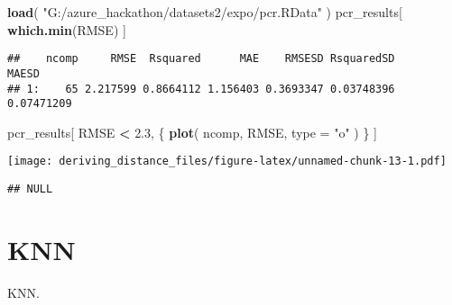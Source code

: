 \documentclass[]{article}
\newenvironment{Shaded}{\begin{snugshade}}{\end{snugshade}}
\newcommand{\DataTypeTok}[1]{\textcolor[rgb]{0.13,0.29,0.53}{#1}}
\newcommand{\DecValTok}[1]{\textcolor[rgb]{0.00,0.00,0.81}{#1}}
\newcommand{\FloatTok}[1]{\textcolor[rgb]{0.00,0.00,0.81}{#1}}
\newcommand{\KeywordTok}[1]{\textcolor[rgb]{0.13,0.29,0.53}{\textbf{#1}}}
\newcommand{\NormalTok}[1]{#1}
\newcommand{\OperatorTok}[1]{\textcolor[rgb]{0.81,0.36,0.00}{\textbf{#1}}}
\newcommand{\StringTok}[1]{\textcolor[rgb]{0.31,0.60,0.02}{#1}}
\begin{document}
\begin{Shaded}
\begin{Highlighting}[]
\KeywordTok{load}\NormalTok{( }\StringTok{"G:/azure_hackathon/datasets2/expo/pcr.RData"}\NormalTok{ )}
\NormalTok{pcr_results[ }\KeywordTok{which.min}\NormalTok{(RMSE) ]}
\end{Highlighting}
\end{Shaded}

\begin{verbatim}
##    ncomp     RMSE  Rsquared      MAE    RMSESD RsquaredSD      MAESD
## 1:    65 2.217599 0.8664112 1.156403 0.3693347 0.03748396 0.07471209
\end{verbatim}

\begin{Shaded}
\begin{Highlighting}[]
\NormalTok{pcr_results[ RMSE }\OperatorTok{<}\StringTok{ }\FloatTok{2.3}\NormalTok{, \{}
    \KeywordTok{plot}\NormalTok{( ncomp, RMSE, }\DataTypeTok{type =} \StringTok{"o"}\NormalTok{ )}
\NormalTok{\} ]}
\end{Highlighting}
\end{Shaded}

\texttt{[image: deriving\_distance\_files/figure-latex/unnamed-chunk-13-1.pdf]}

\begin{verbatim}
## NULL
\end{verbatim}

\hypertarget{knn}{%
\section{KNN}\label{knn}}

KNN.

\begin{Shaded}
\end{Shaded}
\end{document}
